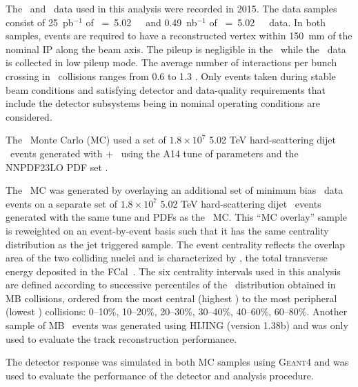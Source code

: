 
The \PbPb\ and \pp\ data used in this analysis were recorded in 2015.
 The data samples consist of 25~pb$^{-1}$ of \sqrts~=~5.02~\TeV\ \pp\ and 0.49~nb$^{-1}$ of \sqrtsnn~=~5.02~\TeV\
\pbpb\ data. In both samples, events are required to have a reconstructed vertex
within 150~mm of the nominal IP along the beam axis. The pileup is negligible in the \pbpb\ while the \pp\ data is collected 
in low pileup mode. The average number of interactions per bunch crossing in \pp\ collisions ranges from 0.6 to 1.3 \cite{Aaboud:2017tke}.
Only events taken during stable beam conditions and satisfying detector and data-quality requirements 
that include the detector subsystems being in nominal operating conditions are considered.

The \pp\ Monte Carlo (MC) used a set of $1.8\times10^7$ 5.02 TeV hard-scattering dijet \pp\ events generated with \powheg{}+\pythiaeight\ \cite{Nason:2004rx,Sjostrand:2014zea} using the A14 tune of parameters \cite{ATLAS2014021} and the NNPDF23LO PDF set \cite{Ball:2012cx}.

The \pbpb\ MC was generated by overlaying an additional set of minimum bias \pbpb\ data events on a separate set 
of $1.8\times10^7$ 5.02 TeV hard-scattering dijet \pp\ events generated with the same tune and PDFs as the \pp\ MC.
 This ``MC overlay'' sample is reweighted on an event-by-event basis such that it has the same centrality distribution 
 as the jet triggered sample. The event centrality reflects the overlap area of the two colliding nuclei and is characterized 
 by \ETfcal, the total transverse energy deposited in the FCal~\cite{Aaboud:2017tql}. The six centrality intervals used 
 in this analysis are defined according to successive percentiles of the \ETfcal\ distribution obtained in MB collisions, 
 ordered from the most central (highest \ETfcal) to the most peripheral (lowest \ETfcal) collisions:
  0--10\%, 10--20\%, 20--30\%, 30--40\%, 40--60\%, 60--80\%. Another sample of MB \pbpb\ events 
 was generated using HIJING (version 1.38b) \cite{Wang:1991hta} and was only used to evaluate the track reconstruction performance. 	
 


 The detector response was simulated in both MC samples using \textsc{Geant4} \cite{Agostinelli:2002hh,Aad:2010ah} and was used to evaluate the performance of the detector and analysis procedure. 

